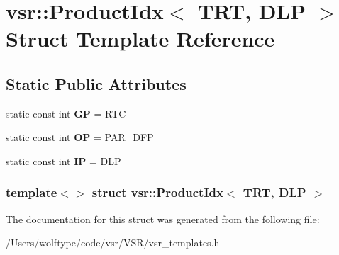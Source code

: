 \hypertarget{structvsr_1_1_product_idx_3_01_t_r_t_00_01_d_l_p_01_4}{\section{vsr\-:\-:Product\-Idx$<$ T\-R\-T, D\-L\-P $>$ Struct Template Reference}
\label{structvsr_1_1_product_idx_3_01_t_r_t_00_01_d_l_p_01_4}
}
\subsection*{Static Public Attributes}
\begin{DoxyCompactItemize}
\item 
\hypertarget{structvsr_1_1_product_idx_3_01_t_r_t_00_01_d_l_p_01_4_a9f7cb6c36eddd9cefac1a832570e3b3a}{static const int {\bfseries G\-P} = R\-T\-C}\label{structvsr_1_1_product_idx_3_01_t_r_t_00_01_d_l_p_01_4_a9f7cb6c36eddd9cefac1a832570e3b3a}

\item 
\hypertarget{structvsr_1_1_product_idx_3_01_t_r_t_00_01_d_l_p_01_4_aa7d561ebc2c90c88df1feb9e2dd37e3d}{static const int {\bfseries O\-P} = P\-A\-R\-\_\-\-D\-F\-P}\label{structvsr_1_1_product_idx_3_01_t_r_t_00_01_d_l_p_01_4_aa7d561ebc2c90c88df1feb9e2dd37e3d}

\item 
\hypertarget{structvsr_1_1_product_idx_3_01_t_r_t_00_01_d_l_p_01_4_af269d60c3a994964bdace4ca1682b412}{static const int {\bfseries I\-P} = D\-L\-P}\label{structvsr_1_1_product_idx_3_01_t_r_t_00_01_d_l_p_01_4_af269d60c3a994964bdace4ca1682b412}

\end{DoxyCompactItemize}
\subsubsection*{template$<$$>$ struct vsr\-::\-Product\-Idx$<$ T\-R\-T, D\-L\-P $>$}



The documentation for this struct was generated from the following file\-:\begin{DoxyCompactItemize}
\item 
/\-Users/wolftype/code/vsr/\-V\-S\-R/vsr\-\_\-templates.\-h\end{DoxyCompactItemize}
